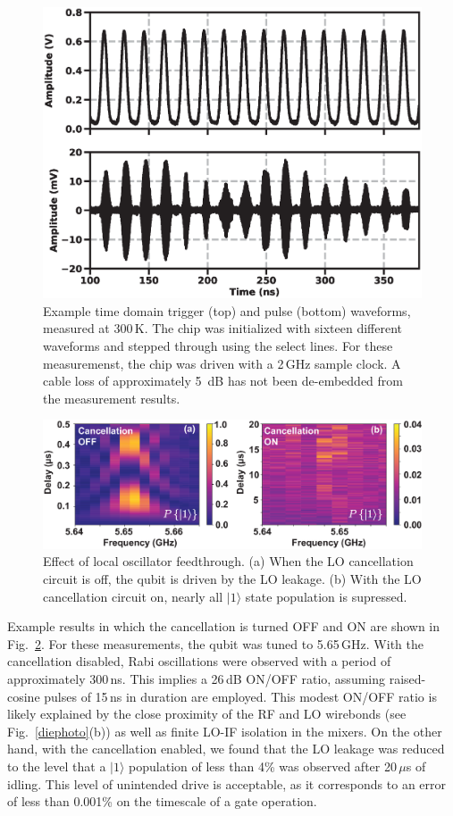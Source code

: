 \documentclass[journal]{IEEEtran}
\newcommand{\CR}[1]{{\color{black}#1}}
\begin{document}
\begin{figure}[bt!]
\includegraphics[width=\columnwidth]{Figures/FIGURE_13}
\caption{Example time domain trigger (top) and pulse (bottom) waveforms, measured at 300\,K. The chip was initialized with sixteen different waveforms and stepped through using the select lines. For these measuremenst, the chip was driven with a 2\,GHz sample clock. A cable loss of approximately 5~dB has not been de-embedded from the measurement results.} \label{timedomain}
\end{figure}
\begin{figure}[bt!]
\includegraphics[width=\columnwidth]{Figures/FIGURE_14}
\caption{Effect of local oscillator feedthrough. (a) When the LO cancellation circuit is off, the qubit is driven by the LO leakage. (b) With the LO cancellation circuit on, nearly all $|1\rangle$ state population is supressed. }\label{LOONOFF}
\end{figure}
Example results in which the cancellation is turned OFF and ON are shown in Fig.~\ref{LOONOFF}. For these measurements, the qubit was tuned to 5.65\,GHz. With the cancellation disabled, Rabi oscillations were observed with a period of approximately 300\,ns. \CR{This implies a 26\,dB ON/OFF ratio, assuming raised-cosine pulses of 15\,ns in duration are employed}. \CR{This modest ON/OFF ratio is likely explained by  the  close proximity of the RF and LO wirebonds (see Fig.~\ref{diephoto}(b)) as well as finite LO-IF isolation in the mixers}. 
On the other hand, with the cancellation enabled, we found that the LO leakage was reduced to the level that a $|1\rangle$ population of less than 4\% was observed after 20\,$\mu$s of idling. This level of unintended drive is  acceptable, as it corresponds to an error of less than \CR{0.001\%} on the timescale of a gate operation. 
\end{document}
